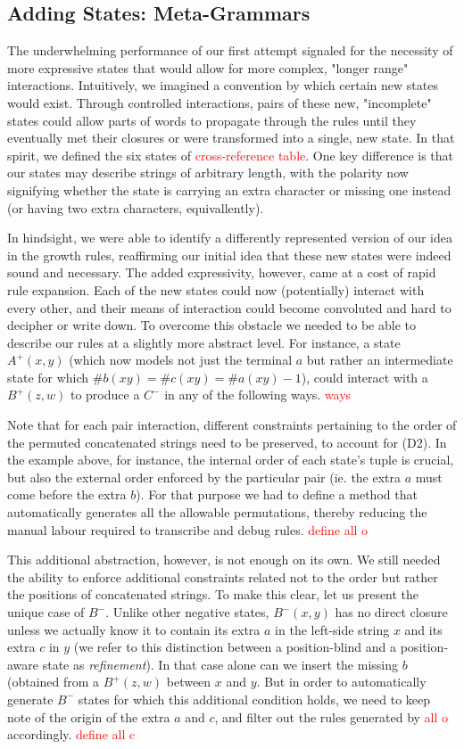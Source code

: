 \documentclass[nonatbib,numbers,10pt]{sigplanconf}
\newcommand\todo[1]{\textcolor{red}{#1}}
\begin{document}
\subsection{Adding States: Meta-Grammars}
The underwhelming performance of our first attempt signaled for the necessity of more expressive states that would allow for more complex, "longer range" interactions. Intuitively, we imagined a convention by which certain new states would exist. Through controlled interactions, pairs of these new, "incomplete" states could allow parts of words to propagate through the rules until they eventually met their closures or were transformed into a single, new state. In that spirit, we defined the six states of \todo{cross-reference table}. One key difference is that our states may describe strings of arbitrary length, with the polarity now signifying whether the state is carrying an extra character or missing one instead (or having two extra characters, equivallently).

In hindsight, we were able to identify a differently represented version of our idea in the growth rules, reaffirming our initial idea that these new states were indeed sound and necessary. The added expressivity, however, came at a cost of rapid rule expansion. Each of the new states could now (potentially) interact with every other, and their means of interaction could become convoluted and hard to decipher or write down. To overcome this obstacle we needed to be able to describe our rules at a slightly more abstract level. For instance, a state $A^{+}(x,y)$ (which now models not just the terminal $a$ but rather an intermediate state for which $ \# b(xy) = \# c(xy) = \# a(xy)-1$), could interact with a $B^{+}(z,w)$ to produce a $C^{-}$ in any of the following ways.
\todo{ways}

Note that for each pair interaction, different constraints pertaining to the order of the permuted concatenated strings need to be preserved, to account for (D2). In the example above, for instance, the internal order of each state's tuple is crucial, but also the external order enforced by the particular pair (ie. the extra $a$ must come before the extra $b$). For that purpose we had to define a method that automatically generates all the allowable permutations, thereby reducing the manual labour required to transcribe and debug rules. 
\todo{define all o}

This additional abstraction, however, is not enough on its own. We still needed the ability to enforce additional constraints related not to the order but rather the positions of concatenated strings. To make this clear, let us present the unique case of $B^{-}$. Unlike other negative states, $B^{-}(x,y)$ has no direct closure unless we actually know it to contain its extra $a$ in the left-side string $x$ and its extra $c$ in $y$ (we refer to this distinction between a position-blind and a position-aware state as \textit{refinement}). In that case alone can we insert the missing $b$ (obtained from a $B^{+}(z,w)$ between $x$ and $y$. But in order to automatically generate $B^{-}$ states for which this additional condition holds, we need to keep note of the origin of the extra $a$ and $c$, and filter out the rules generated by \todo{all o} accordingly. 
\todo{define all c}
\end{document}
